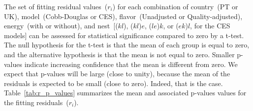 \documentclass[preprint,authoryear,12pt]{elsarticle}\usepackage[]{graphicx}\usepackage[]{color}
\begin{document}
The set of fitting residual values~($r_i$)
for each combination of 
country~(PT or UK), 
model~(Cobb-Douglas or CES),
flavor~(Unadjusted or Quality-adjusted), 
energy~(with or without), and
nest~[($kl$), ($kl$)$e$, ($le$)$k$, or ($ek$)$l$, for the CES models]
can be assessed for statistical significance
compared to zero by a t-test.
The null hypothesis for the t-test is that the mean of each group is
equal to zero, and 
the alternative hypothesis is that the mean is not equal to zero.
Smaller p-values indicate increasing confidence that the 
mean is different from zero. 
We expect that p-values will be large (close to unity), 
because the mean of the residuals is expected to be small (close to zero).
Indeed, that is the case.
Table~\ref{tab:r_p_values} summarizes the mean 
and associated p-values values for the fitting residuals~($r_i$).
%
\end{document}
